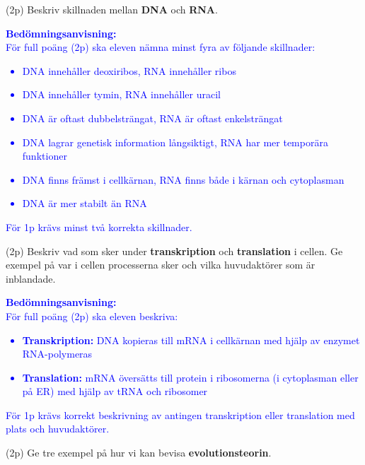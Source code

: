 \documentclass{exam}
\begin{document}
\break

\begin{center}
\end{center}
\vspace{5mm}
\begin{questions}

\question (2p) Beskriv skillnaden mellan \textbf{DNA} och \textbf{RNA}.

\textcolor{blue}{
\textbf{Bedömningsanvisning:}\\
För full poäng (2p) ska eleven nämna minst fyra av följande skillnader:
\begin{itemize}
\item DNA innehåller deoxiribos, RNA innehåller ribos
\item DNA innehåller tymin, RNA innehåller uracil
\item DNA är oftast dubbelsträngat, RNA är oftast enkelsträngat
\item DNA lagrar genetisk information långsiktigt, RNA har mer temporära funktioner
\item DNA finns främst i cellkärnan, RNA finns både i kärnan och cytoplasman
\item DNA är mer stabilt än RNA
\end{itemize}
För 1p krävs minst två korrekta skillnader.
}
\vspace{10mm}

\question (2p) Beskriv vad som sker under \textbf{transkription} och \textbf{translation} i cellen. Ge exempel på var i cellen processerna sker och vilka huvudaktörer som är inblandade.

\textcolor{blue}{
\textbf{Bedömningsanvisning:}\\
För full poäng (2p) ska eleven beskriva:
\begin{itemize}
\item \textbf{Transkription:} DNA kopieras till mRNA i cellkärnan med hjälp av enzymet RNA-polymeras
\item \textbf{Translation:} mRNA översätts till protein i ribosomerna (i cytoplasman eller på ER) med hjälp av tRNA och ribosomer
\end{itemize}
För 1p krävs korrekt beskrivning av antingen transkription eller translation med plats och huvudaktörer.
}
\vspace{10mm}

\question (2p) Ge tre exempel på hur vi kan bevisa \textbf{evolutionsteorin}.


\end{questions}
\end{document}
